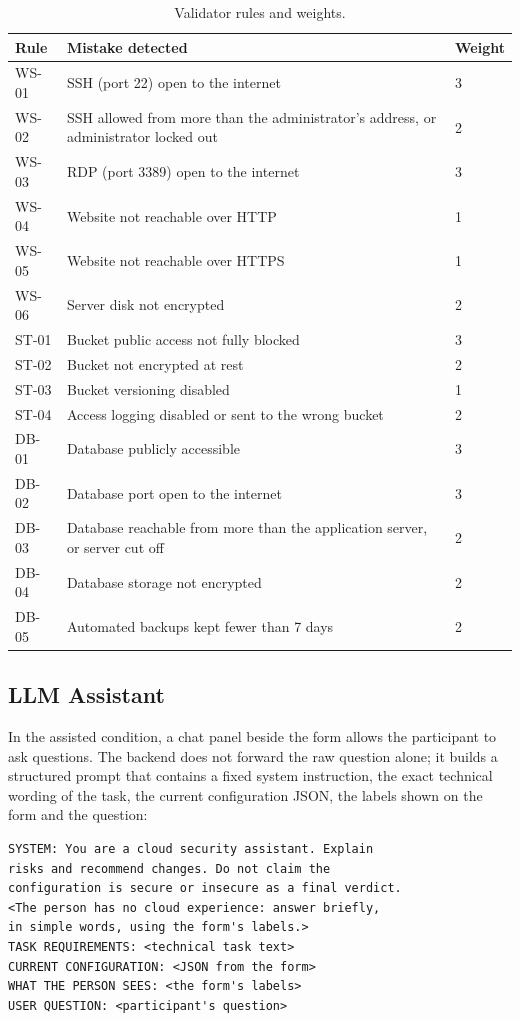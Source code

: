 \begin{table}[width=\textwidth,cols=3,pos=h]
\caption{Validator rules and weights.}\label{tbl:rules}
\begin{tabular*}{\tblwidth}{@{} LLL@{} }
\toprule
Rule & Mistake detected & Weight\\
\midrule
WS-01 & SSH (port 22) open to the internet & 3\\
WS-02 & SSH allowed from more than the administrator's address, or administrator locked out & 2\\
WS-03 & RDP (port 3389) open to the internet & 3\\
WS-04 & Website not reachable over HTTP & 1\\
WS-05 & Website not reachable over HTTPS & 1\\
WS-06 & Server disk not encrypted & 2\\
ST-01 & Bucket public access not fully blocked & 3\\
ST-02 & Bucket not encrypted at rest & 2\\
ST-03 & Bucket versioning disabled & 1\\
ST-04 & Access logging disabled or sent to the wrong bucket & 2\\
DB-01 & Database publicly accessible & 3\\
DB-02 & Database port open to the internet & 3\\
DB-03 & Database reachable from more than the application server, or server cut off & 2\\
DB-04 & Database storage not encrypted & 2\\
DB-05 & Automated backups kept fewer than 7 days & 2\\
\bottomrule
\end{tabular*}
\end{table}

\subsection{LLM Assistant}

In the assisted condition, a chat panel beside the form allows the participant to ask questions. The backend does not forward the raw question alone; it builds a structured prompt that contains a fixed system instruction, the exact technical wording of the task, the current configuration JSON, the labels shown on the form and the question:

\begin{verbatim}
SYSTEM: You are a cloud security assistant. Explain
risks and recommend changes. Do not claim the
configuration is secure or insecure as a final verdict.
<The person has no cloud experience: answer briefly,
in simple words, using the form's labels.>
TASK REQUIREMENTS: <technical task text>
CURRENT CONFIGURATION: <JSON from the form>
WHAT THE PERSON SEES: <the form's labels>
USER QUESTION: <participant's question>
\end{verbatim}

